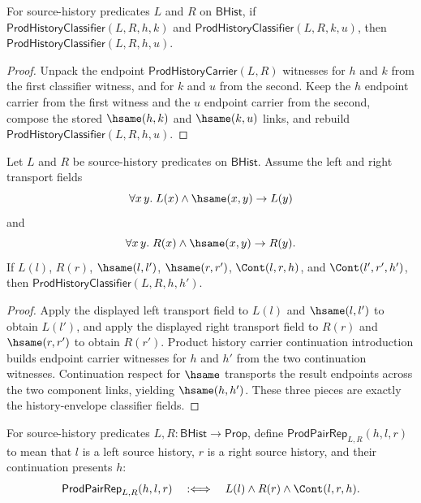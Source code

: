 \begin{theorem}
\label{thm:prod-history-classifier-transitivity}
For source-history predicates $L$ and $R$ on $\mathsf{BHist}$, if $\mathsf{ProdHistoryClassifier}(L,R,h,k)$ and $\mathsf{ProdHistoryClassifier}(L,R,k,u)$, then $\mathsf{ProdHistoryClassifier}(L,R,h,u)$.
\end{theorem}
\begin{proof}
Unpack the endpoint $\mathsf{ProdHistoryCarrier}(L,R)$ witnesses for $h$ and $k$ from the first classifier witness, and for $k$ and $u$ from the second. Keep the $h$ endpoint carrier from the first witness and the $u$ endpoint carrier from the second, compose the stored $\hsame(h,k)$ and $\hsame(k,u)$ links, and rebuild $\mathsf{ProdHistoryClassifier}(L,R,h,u)$.
\end{proof}

\begin{theorem}
\label{thm:prod-history-classifier-cont-congr}
Let $L$ and $R$ be source-history predicates on $\mathsf{BHist}$. Assume the left and right transport fields
$$
\forall x\,y.\; L(x)\land\hsame(x,y)\to L(y)
$$
and
$$
\forall x\,y.\; R(x)\land\hsame(x,y)\to R(y).
$$
If $L(l)$, $R(r)$, $\hsame(l,l')$, $\hsame(r,r')$, $\Cont(l,r,h)$, and $\Cont(l',r',h')$, then
$\mathsf{ProdHistoryClassifier}(L,R,h,h')$.
\end{theorem}
\begin{proof}
Apply the displayed left transport field to $L(l)$ and $\hsame(l,l')$ to obtain $L(l')$, and apply the displayed right transport field to $R(r)$ and $\hsame(r,r')$ to obtain $R(r')$. Product history carrier continuation introduction builds endpoint carrier witnesses for $h$ and $h'$ from the two continuation witnesses. Continuation respect for $\hsame$ transports the result endpoints across the two component links, yielding $\hsame(h,h')$. These three pieces are exactly the history-envelope classifier fields.
\end{proof}

\begin{definition}
\label{def:prod-pair-rep}
For source-history predicates $L,R:\mathsf{BHist}\to\mathsf{Prop}$, define
$\mathsf{ProdPairRep}_{L,R}(h,l,r)$ to mean that $l$ is a left source
history, $r$ is a right source history, and their continuation presents $h$:
$$
  \mathsf{ProdPairRep}_{L,R}(h,l,r)
  \quad:\Longleftrightarrow\quad
  L(l)\wedge R(r)\wedge \Cont(l,r,h).
$$
\end{definition}

